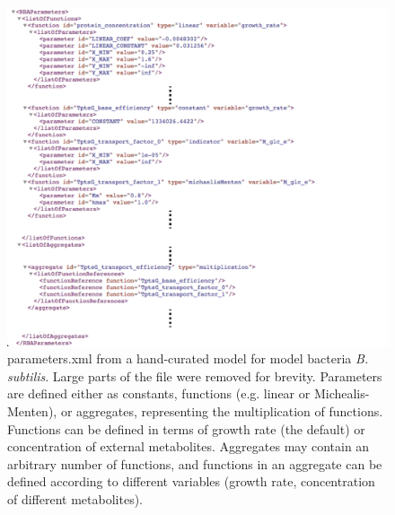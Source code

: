 \begin{figure}
  \centering
  \includegraphics[scale=0.6]{figures/parameters_ex_1}
  \caption{parameters.xml from a hand-curated model for model bacteria \textit{B. subtilis}.
  Large parts of the file were removed for brevity.
  Parameters are defined either as constants, functions (e.g. linear or Michealis-Menten),
  or aggregates, representing the multiplication of functions.
  Functions can be defined in terms of growth rate (the default) or concentration
  of external metabolites.
  Aggregates may contain an arbitrary number of functions,
  and functions in an aggregate can be defined according to different variables
  (growth rate, concentration of different metabolites).}
  \label{fig:parameters_ex_1}
\end{figure}


